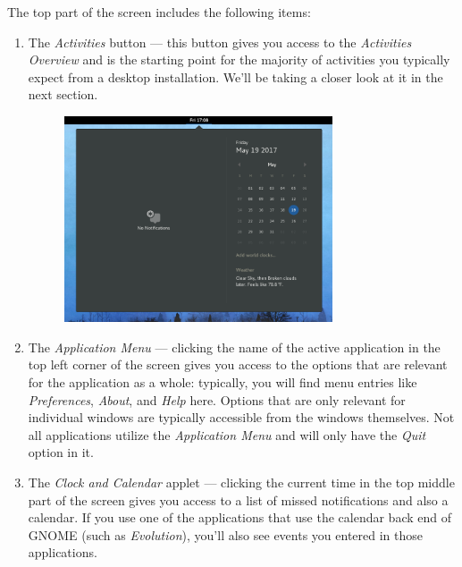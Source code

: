 The top part of the screen includes the following items:
\begin{enumerate}
\item The \emph{Activities} button --- this button gives you access to the \emph{Activities Overview} and is the starting point for the majority of activities you typically expect from a desktop installation. We'll be taking a closer look at it in the next section.

\begin{figure}[t]
\begin{center}
\includegraphics[width=0.75\textwidth]{img/calendar}
 \label{fig:calendar}
\end{center}
\end{figure}



\item The \emph{Application Menu} --- clicking the name of the active application in the top left corner of the screen gives you access to the options that are relevant for the application as a whole: typically, you will find menu entries like \emph{Preferences}, \emph{About}, and \emph{Help} here. Options that are only relevant for individual windows are typically accessible from the windows themselves. Not all applications utilize the \emph{Application Menu} and will only have the \emph{Quit} option in it.

\item The \emph{Clock and Calendar} applet --- clicking the current time in the top middle part of the screen gives you access to a list of missed notifications and also a calendar. If you use one of the applications that use the calendar back end of GNOME (such as \emph{Evolution}), you'll also see events you entered in those applications.


\end{enumerate}
